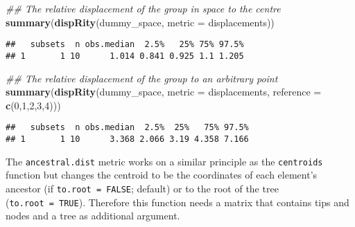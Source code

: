 \documentclass[
]{book}
\newenvironment{Shaded}{\begin{snugshade}}{\end{snugshade}}
\newcommand{\CommentTok}[1]{\textcolor[rgb]{0.56,0.35,0.01}{\textit{#1}}}
\newcommand{\DataTypeTok}[1]{\textcolor[rgb]{0.13,0.29,0.53}{#1}}
\newcommand{\DecValTok}[1]{\textcolor[rgb]{0.00,0.00,0.81}{#1}}
\newcommand{\KeywordTok}[1]{\textcolor[rgb]{0.13,0.29,0.53}{\textbf{#1}}}
\newcommand{\NormalTok}[1]{#1}
\begin{document}
\begin{Shaded}
\begin{Highlighting}[]
\CommentTok{\#\# The relative displacement of the group in space to the centre}
\KeywordTok{summary}\NormalTok{(}\KeywordTok{dispRity}\NormalTok{(dummy\_space, }\DataTypeTok{metric =}\NormalTok{ displacements))}
\end{Highlighting}
\end{Shaded}

\begin{verbatim}
##   subsets  n obs.median  2.5%   25% 75% 97.5%
## 1       1 10      1.014 0.841 0.925 1.1 1.205
\end{verbatim}

\begin{Shaded}
\begin{Highlighting}[]
\CommentTok{\#\# The relative displacement of the group to an arbitrary point}
\KeywordTok{summary}\NormalTok{(}\KeywordTok{dispRity}\NormalTok{(dummy\_space, }\DataTypeTok{metric =}\NormalTok{ displacements,}
                 \DataTypeTok{reference =} \KeywordTok{c}\NormalTok{(}\DecValTok{0}\NormalTok{,}\DecValTok{1}\NormalTok{,}\DecValTok{2}\NormalTok{,}\DecValTok{3}\NormalTok{,}\DecValTok{4}\NormalTok{)))}
\end{Highlighting}
\end{Shaded}

\begin{verbatim}
##   subsets  n obs.median  2.5%  25%   75% 97.5%
## 1       1 10      3.368 2.066 3.19 4.358 7.166
\end{verbatim}

The \texttt{ancestral.dist} metric works on a similar principle as the \texttt{centroids} function but changes the centroid to be the coordinates of each element's ancestor (if \texttt{to.root\ =\ FALSE}; default) or to the root of the tree (\texttt{to.root\ =\ TRUE}).
Therefore this function needs a matrix that contains tips and nodes and a tree as additional argument.
\end{document}
